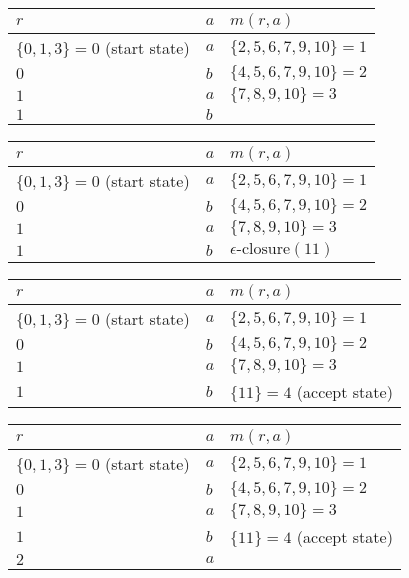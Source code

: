 \documentclass[8pt,a4paper,compress]{beamer}
\begin{document}
\begin{frame}[fragile]
\begin{overprint}
\begin{center}
\begin{tabular}{|C{4cm}|C{.5cm}|C{4cm}|} \hline
$r$ & $a$ & $m(r, a)$ \\ \hline \hline
$\{0, 1, 3\} = 0$ (start state) & $a$ &  $\{2, 5, 6, 7, 9, 10\} = 1$ \\ \hline
$0$ & $b$ & $\{4, 5, 6, 7, 9, 10\} = 2$  \\ \hline
$1$ & $a$ & $\{7, 8, 9, 10\} = 3$  \\ \hline
$1$ & $b$ &   \\ \hline
\end{tabular}
\end{center}

\begin{center}
\begin{tabular}{|C{4cm}|C{.5cm}|C{4cm}|} \hline
$r$ & $a$ & $m(r, a)$ \\ \hline \hline
$\{0, 1, 3\} = 0$ (start state) & $a$ &  $\{2, 5, 6, 7, 9, 10\} = 1$ \\ \hline
$0$ & $b$ & $\{4, 5, 6, 7, 9, 10\} = 2$  \\ \hline
$1$ & $a$ & $\{7, 8, 9, 10\} = 3$  \\ \hline
$1$ & $b$ & $\epsilon\text{-closure}(11)$  \\ \hline
\end{tabular}
\end{center}

\begin{center}
\begin{tabular}{|C{4cm}|C{.5cm}|C{4cm}|} \hline
$r$ & $a$ & $m(r, a)$ \\ \hline \hline
$\{0, 1, 3\} = 0$ (start state) & $a$ &  $\{2, 5, 6, 7, 9, 10\} = 1$ \\ \hline
$0$ & $b$ & $\{4, 5, 6, 7, 9, 10\} = 2$  \\ \hline
$1$ & $a$ & $\{7, 8, 9, 10\} = 3$  \\ \hline
$1$ & $b$ & $\{11\} = 4$ (accept state)  \\ \hline
\end{tabular}
\end{center}

\begin{center}
\begin{tabular}{|C{4cm}|C{.5cm}|C{4cm}|} \hline
$r$ & $a$ & $m(r, a)$ \\ \hline \hline
$\{0, 1, 3\} = 0$ (start state) & $a$ &  $\{2, 5, 6, 7, 9, 10\} = 1$ \\ \hline
$0$ & $b$ & $\{4, 5, 6, 7, 9, 10\} = 2$  \\ \hline
$1$ & $a$ & $\{7, 8, 9, 10\} = 3$  \\ \hline
$1$ & $b$ & $\{11\} = 4$ (accept state)  \\ \hline
$2$ & $a$ &   \\ \hline
\end{tabular}
\end{center}


\end{overprint}
\end{frame}
\end{document}
